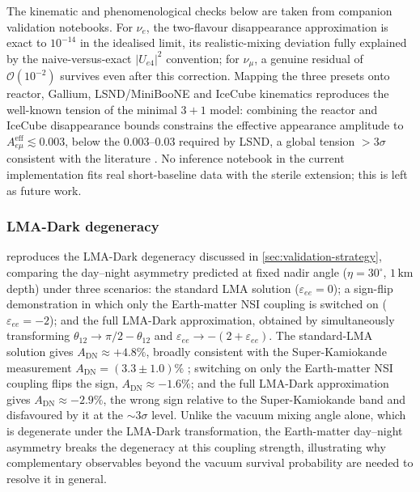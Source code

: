 The kinematic and phenomenological checks below are taken from companion validation notebooks. For \(\nu_e\), the two-flavour disappearance approximation is exact to \(10^{-14}\) in the idealised limit, its realistic-mixing deviation fully explained by the naive-versus-exact \(|U_{e4}|^2\) convention; for \(\nu_\mu\), a genuine residual of \(\mathcal O(10^{-2})\) survives even after this correction. Mapping the three presets onto reactor, Gallium, LSND/MiniBooNE and IceCube kinematics reproduces the well-known tension of the minimal \(3+1\) model: combining the reactor and IceCube disappearance bounds constrains the effective appearance amplitude to \(A_{e\mu}^{\mathrm{eff}}\lesssim0.003\), below the \(0.003\)--\(0.03\) required by LSND, a global tension \(>3\sigma\) consistent with the literature \parencite{Boser2020}. No inference notebook in the current implementation fits real short-baseline data with the sterile extension; this is left as future work.

\subsubsection{LMA-Dark degeneracy}

 reproduces the LMA-Dark degeneracy discussed in \cref{sec:validation-strategy}, comparing the day--night asymmetry predicted at fixed nadir angle (\(\eta=30^\circ\), \(1\,\mathrm{km}\) depth) under three scenarios: the standard LMA solution (\(\varepsilon_{ee}=0\)); a sign-flip demonstration in which only the Earth-matter NSI coupling is switched on (\(\varepsilon_{ee}=-2\)); and the full LMA-Dark approximation, obtained by simultaneously transforming \(\theta_{12}\to\pi/2-\theta_{12}\) and \(\varepsilon_{ee}\to-(2+\varepsilon_{ee})\). The standard-LMA solution gives \(A_{\mathrm{DN}}\approx+4.8\%\), broadly consistent with the Super-Kamiokande measurement \(A_{\mathrm{DN}}=(3.3\pm1.0)\%\) \parencite{SuperKamiokande2016}; switching on only the Earth-matter NSI coupling flips the sign, \(A_{\mathrm{DN}}\approx-1.6\%\); and the full LMA-Dark approximation gives \(A_{\mathrm{DN}}\approx-2.9\%\), the wrong sign relative to the Super-Kamiokande band and disfavoured by it at the \(\sim3\sigma\) level. Unlike the vacuum mixing angle alone, which is degenerate under the LMA-Dark transformation, the Earth-matter day--night asymmetry breaks the degeneracy at this coupling strength, illustrating why complementary observables beyond the vacuum survival probability are needed to resolve it in general.

